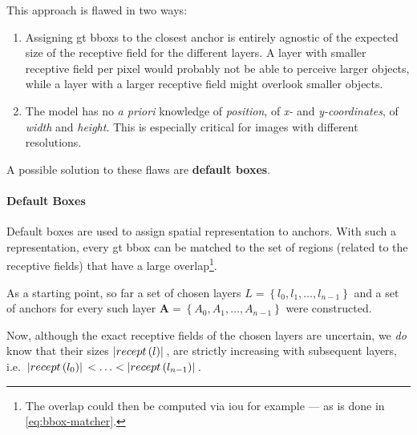 This approach is flawed in two ways:
\begin{enumerate}
    \item Assigning \gls{gt} \glspl{bbox} to the closest anchor is entirely agnostic
    of the expected size of the receptive field for the different layers. A layer
    with smaller receptive field per pixel would probably not be able to perceive
    larger objects, while a layer with a larger receptive field might overlook
    smaller objects.\label{itm:anchor-flaw1}
    \item The model has no \textit{a priori} knowledge of \emph{position}, of
    \emph{x-} and \emph{y-coordinates}, of \emph{width} and \emph{height}.
    This is especially critical for images with different resolutions.\label{itm:anchor-flaw2}
\end{enumerate}
A possible solution to these flaws are \textbf{default boxes}.

\paragraph{Default Boxes}\label{par:default-boxes}
Default boxes are used to assign spatial representation to anchors. With such a
representation, every \gls{gt} \gls{bbox} can be matched to the set of regions
(related to the receptive fields) that have a large overlap\footnote{The overlap
could then be computed via \gls{iou} for example --- as is done in \cref{eq:bbox-matcher}.}.

As a starting point, so far a set of chosen layers \(L = \left\{l_0, l_1, \ldots, l_{n-1}\right\}\)
and a set of anchors for every such layer \(\mathbf{A} = \left\{A_0, A_1, \ldots, A_{n-1}\right\}\)
were constructed.

Now, although the exact receptive fields of the chosen layers are uncertain, 
we \emph{do} know that their sizes \(\abs*{recept\left(l\right)}\), are strictly
increasing with subsequent layers, i.e.\ \(\abs*{recept\left(l_0\right)} < \ldots < \abs*{recept\left(l_{n-1}\right)}\).

